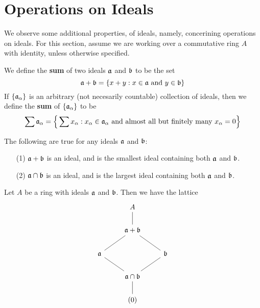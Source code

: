 \section{Operations on Ideals}

We observe some additional properties, of ideals, namely, concerining operations
on ideals. For this section, assume we are working over a commutative ring $A$
with identity, unless otherwise specified.

\begin{definition}
  We define the \textbf{sum} of two ideals $\af$ and  $\bf$ to be the set
  \begin{equation*}
    \af+\bf=\{x+y : x \in \af \text{ and } y \in \bf\}
  \end{equation*}
  If $\{\af_\a\}$ is an arbitrary (not necesarily countable) collection of
  ideals, then we define the \textbf{sum} of $\{\af_\a\}$ to be
  \begin{equation*}
    \sum{\af_\a}=
    \Big{\{} \sum{x_\a} : x_\a \in \af_\a \text{ and almost all but finitely
    many } x_\a=0 \Big{\}}
  \end{equation*}
\end{definition}

\begin{lemma}\label{lemma_1.10.1}
  The following are true for any ideals $\af$ and $\bf$:
  \begin{enumerate}
    \item[(1)] $\af+\bf$ is an ideal, and is the smallest ideal containing both
       $\af$ and  $\bf$.

     \item[(2)] $\af \cap \bf$ is an ideal, and is the largest ideal containing
       both $\af$ and $\bf$.
  \end{enumerate}
\end{lemma}
\begin{corollary}
    Let $A$ be a ring with ideals $\af$ and $\bf$. Then we have the lattice
    \[\begin{tikzcd}
	& A \\
	& {\af+\bf} \\
	\af && \bf \\
	& \af \cap \bf \\
	& {(0)}
	\arrow[no head, from=1-2, to=2-2]
	\arrow[no head, from=2-2, to=3-1]
	\arrow[no head, from=3-1, to=4-2]
	\arrow[no head, from=4-2, to=3-3]
	\arrow[no head, from=3-3, to=2-2]
	\arrow[no head, from=4-2, to=5-2]
    \end{tikzcd}\]
\end{corollary}

